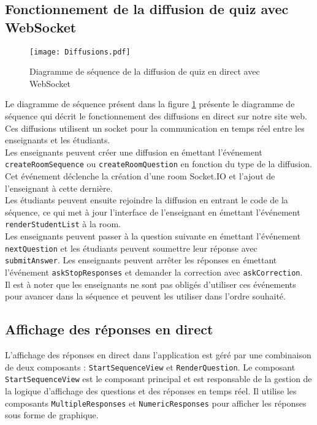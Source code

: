 \subsection{Fonctionnement de la diffusion de quiz avec WebSocket}

\vspace{3mm}
\begin{figure}[H]
\centering
\texttt{[image: Diffusions.pdf]}
\caption{Diagramme de séquence de la diffusion de quiz en direct avec WebSocket}
\label{fig:diffusions}
\end{figure}
\vspace{2mm}

Le diagramme de séquence présent dans la figure \ref{fig:diffusions} présente le diagramme de séquence qui décrit le fonctionnement des diffusions en direct sur notre site web. Ces diffusions utilisent un socket pour la communication en temps réel entre les enseignants et les étudiants.\\

Les enseignants peuvent créer une diffusion en émettant l'événement \texttt{createRoomSequence} ou \texttt{createRoomQuestion} en fonction du type de la diffusion. Cet événement déclenche la création d'une room Socket.IO et l'ajout de l'enseignant à cette dernière.\\

Les étudiants peuvent ensuite rejoindre la diffusion en entrant le code de la séquence, ce qui met à jour l'interface de l'enseignant en émettant l'événement \texttt{renderStudentList} à la room.\\

Les enseignants peuvent passer à la question suivante en émettant l'événement \texttt{nextQuestion} et les étudiants peuvent soumettre leur réponse avec \texttt{submitAnswer}. Les enseignants peuvent arrêter les réponses en émettant l'événement \texttt{askStopResponses} et demander la correction avec \texttt{askCorrection}.\\

Il est à noter que les enseignants ne sont pas obligés d'utiliser ces événements pour avancer dans la séquence et peuvent les utiliser dans l'ordre souhaité.

\vspace{5mm}
\subsection{Affichage des réponses en direct}
L'affichage des réponses en direct dans l'application est géré par une combinaison de deux composants : \texttt{StartSequenceView} et \texttt{RenderQuestion}.
Le composant \texttt{StartSequenceView} est le composant principal et est responsable de la gestion de la logique d'affichage des questions et des réponses en temps réel. 
Il utilise les composants \texttt{MultipleResponses} et \texttt{NumericResponses} pour afficher les réponses sous forme de graphique.\\


